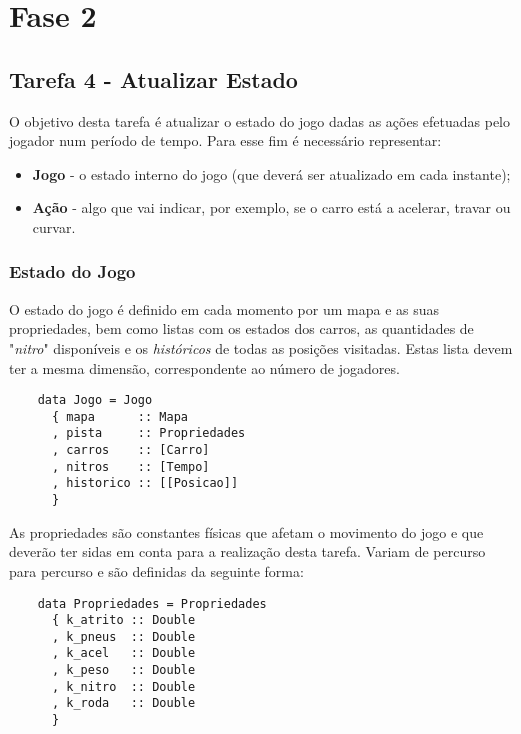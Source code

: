 \documentclass[a4paper]{report}
\begin{document}
\section{Fase 2}

\subsection{Tarefa 4 - Atualizar Estado}
\label{analisetarefa4}

O objetivo desta tarefa é atualizar o estado do jogo dadas as ações efetuadas pelo jogador num período de tempo. Para esse fim é necessário representar:
 
\begin{itemize}
    \item \textbf{Jogo} - o estado interno do jogo (que deverá ser atualizado em cada instante);
    \item \textbf{Ação} - algo que vai indicar, por exemplo, se o carro está a acelerar, travar ou curvar.
\end{itemize}

\subsubsection{Estado do Jogo}

O estado do jogo é definido em cada momento por um mapa e as suas propriedades, bem como listas com os estados dos carros, as quantidades de "\textit{nitro}" disponíveis e os \textit{históricos} de todas as posições visitadas. Estas lista devem ter a mesma dimensão, correspondente ao número de jogadores.

\begin{verbatim}
    data Jogo = Jogo
      { mapa      :: Mapa
      , pista     :: Propriedades
      , carros    :: [Carro]
      , nitros    :: [Tempo]
      , historico :: [[Posicao]]
      }
\end{verbatim}

As propriedades são constantes físicas que afetam o movimento do jogo e que deverão ter sidas em conta para a realização desta tarefa. Variam de percurso para percurso e são definidas da seguinte forma:

\begin{verbatim}
    data Propriedades = Propriedades
      { k_atrito :: Double
      , k_pneus  :: Double
      , k_acel   :: Double
      , k_peso   :: Double
      , k_nitro  :: Double
      , k_roda   :: Double
      }
\end{verbatim}
\end{document}
